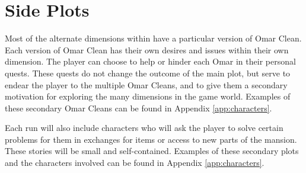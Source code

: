 \section{Side Plots}
Most of the alternate dimensions within \ourgame{} have a particular version of Omar Clean. Each version of Omar Clean has their own desires and issues within their own dimension. The player can choose to help or hinder each Omar in their personal quests. These quests do not change the outcome of the main plot, but serve to endear the player to the multiple Omar Cleans, and to give them a secondary motivation for exploring the many dimensions in the game world. Examples of these secondary Omar Cleans can be found in Appendix \ref{app:characters}.

Each run will also include characters who will ask the player to solve certain problems for them in exchanges for items or access to new parts of the mansion. These stories will be small and self-contained. Examples of these secondary plots and the characters involved can be found in Appendix \ref{app:characters}.